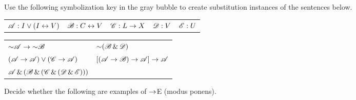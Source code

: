 \noindent\problempart Use the following symbolization key in the gray bubble to create substitution instances of the sentences below.

\begin{mdframed}[style=mytablebox] 
\begin{longtabu}{X[1]X[1]X[1]X[.5]X[.5]} 
$\mathscr{A}: I \vee (I \leftrightarrow V)  $ 
&	$\mathscr{B}: C \leftrightarrow V$ 
&	$\mathscr{C}: L \rightarrow X$  
&	$\mathscr{D}: V$  
&	$\mathscr{E}: U$ 
\end{longtabu}
\end{mdframed}

\begin{exercises}
\begin{longtabu}{X[1,l,m]X[1,p,m]} 
\item $\mathord{\sim} \mathscr{A} \rightarrow \mathord{\sim} \mathscr{B}$ 
&
\item $\mathord{\sim}(\mathscr{B} \,\&\, \mathscr{D})$ 
\\
\item $(\mathscr{A} \rightarrow \mathscr{A}) \vee (\mathscr{C} \rightarrow \mathscr{A})$ 
&
\item $[(\mathscr{A} \rightarrow \mathscr{B}) \rightarrow \mathscr{A}] \rightarrow \mathscr{A}$ 
\\
\item $\mathscr{A} \,\&\, (\mathscr{B} \,\&\, (\mathscr{C} \,\&\, (\mathscr{D} \,\&\, \mathscr{E})))$
&\\
\end{longtabu}
\end{exercises}



\noindent\problempart \label{sec4.1partC} Decide whether the following are examples of $\rightarrow$E (modus ponens).


